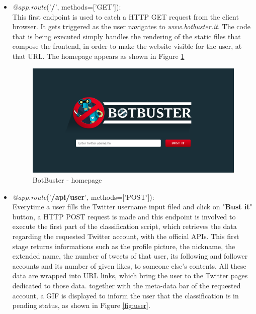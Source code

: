 \begin{itemize}
	\item[\PencilRight] \textit{@app.route}('\textbf{/}', methods=['GET']):\\
	This first endpoint is used to catch a HTTP GET request from the client browser.
	It gets triggered as the user navigates to \textit{www.botbuster.it}. The code that is being executed simply handles the rendering of the static files that compose the frontend, in order to make the website visible for the user, at that URL. The homepage appears as shown in Figure \ref{fig:homepage}
	\begin{figure}[htp!]
		\begin{center}
			\includegraphics[width=\columnwidth]{chapter7/figure/homepage.png}\par 
		\end{center}
		\caption{BotBuster - homepage}
		\label{fig:homepage}
	\end{figure}
	\item[\PencilRight] \textit{@app.route}('\textbf{/api/user}', methods=['POST']):\\
	 Everytime a user fills the Twitter username input filed and click on "\textbf{Bust it}" button, a HTTP POST request is made and this endpoint is involved to execute the first part of the classification script, which retrieves the data regarding the requested Twitter account, with the official APIs. This first stage returns informations such as the profile picture, the nickname, the extended name, the number of tweets of that user, its following and follower accounts and its number of given likes, to someone else's contents.
	 All these data are wrapped into URL links, which bring the user to the Twitter pages dedicated to those data. together with the meta-data bar of the requested account, a GIF is displayed to inform the user that the classification is in pending status, as shown in Figure \ref{fig:user}.

\end{itemize}
